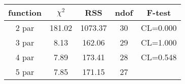 \begin{tabular}{c|c|c|c|c}
function & $\chi^2$ & RSS & ndof & F-test \\
\hline
2 par & 181.02 & 1073.37 & 30 & CL=0.000 \\
3 par & 8.13 & 162.06 & 29 & CL=1.000 \\
4 par & 7.89 & 173.41 & 28 & CL=0.548 \\
5 par & 7.85 & 171.15 & 27 & \\
\hline
\end{tabular}